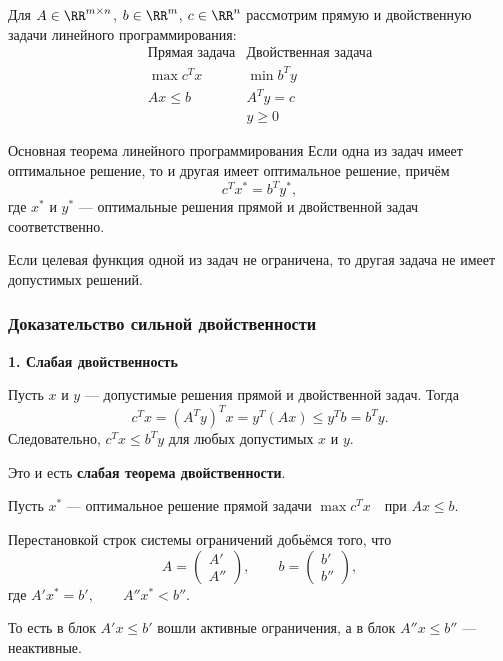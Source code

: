 Для $A \in \RR^{m \times n}$, $b \in \RR^m$, $c \in \RR^n$ рассмотрим прямую и двойственную задачи линейного программирования:
\[
\begin{array}{c|c}
	\text{Прямая задача} & \text{Двойственная задача} \\ \hline
	\max c^T x & \min b^T y \\
	Ax \le b & A^T y = c \\
	& y \ge 0
\end{array}
\]

\begin{Theorem}{Основная теорема линейного программирования}{}
	Если одна из задач имеет оптимальное решение, то и другая имеет оптимальное решение, причём
	\[
	c^T x^* = b^T y^*,
	\]
	где $x^*$ и $y^*$ --- оптимальные решения прямой и двойственной задач соответственно.
\end{Theorem}

\begin{Corollary}{}{}
	Если целевая функция одной из задач не ограничена, то другая задача не имеет допустимых решений.
\end{Corollary}

\subsubsection*{Доказательство сильной двойственности}

\textbf{1. Слабая двойственность}

Пусть $x$ и $y$ --- допустимые решения прямой и двойственной задач. Тогда
\[
c^T x = (A^T y)^T x = y^T (Ax) \le y^T b = b^T y.
\]
Следовательно, $c^T x \le b^T y$ для любых допустимых $x$ и $y$.

Это и есть \textbf{слабая теорема двойственности}.

\medskip

Пусть $x^*$ --- оптимальное решение прямой задачи $\max c^T x \quad \text{при } Ax \le b.$

Перестановкой строк системы ограничений добьёмся того, что
\[
A =
\begin{pmatrix}
	A'\\
	A''
\end{pmatrix},
\qquad
b =
\begin{pmatrix}
	b'\\
	b''
\end{pmatrix},
\]
где $A'x^* = b', \qquad A''x^* < b''.$

То есть в блок $A'x \le b'$ вошли активные ограничения, а в блок $A''x \le b''$ --- неактивные.

